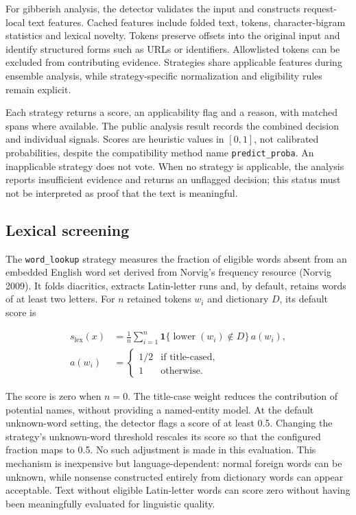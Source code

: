 \documentclass[10pt,a4paper,twocolumn]{article}
\begin{document}
For gibberish analysis, the detector validates the input and constructs
request-local text features. Cached features include folded text,
tokens, character-bigram statistics and lexical novelty. Tokens preserve
offsets into the original input and identify structured forms such as
URLs or identifiers. Allowlisted tokens can be excluded from
contributing evidence. Strategies share applicable features during
ensemble analysis, while strategy-specific normalization and eligibility
rules remain explicit.

Each strategy returns a score, an applicability flag and a reason, with
matched spans where available. The public analysis result records the
combined decision and individual signals. Scores are heuristic values in
\([0,1]\), not calibrated probabilities, despite the compatibility
method name \texttt{predict\_proba}. An inapplicable strategy does not
vote. When no strategy is applicable, the analysis reports insufficient
evidence and returns an unflagged decision; this status must not be
interpreted as proof that the text is meaningful.

\subsection{Lexical screening}\label{lexical-screening}

The \texttt{word\_lookup} strategy measures the fraction of eligible
words absent from an embedded English word set derived from Norvig's
frequency resource (Norvig 2009). It folds diacritics, extracts
Latin-letter runs and, by default, retains words of at least two
letters. For \(n\) retained tokens \(w_i\) and dictionary \(D\), its
default score is

\begin{equation}
\begin{aligned}
s_{\mathrm{lex}}(x)&=\frac{1}{n}\sum_{i=1}^{n}
\mathbf{1}\{\operatorname{lower}(w_i)\notin D\}\,a(w_i),\\
a(w_i)&=\begin{cases}1/2 & \text{if title-cased},\\1 & \text{otherwise}.\end{cases}
\end{aligned}
\end{equation}

The score is zero when \(n=0\). The title-case weight reduces the
contribution of potential names, without providing a named-entity model.
At the default unknown-word setting, the detector flags a score of at
least 0.5. Changing the strategy's unknown-word threshold rescales its
score so that the configured fraction maps to 0.5. No such adjustment is
made in this evaluation. This mechanism is inexpensive but
language-dependent: normal foreign words can be unknown, while nonsense
constructed entirely from dictionary words can appear acceptable. Text
without eligible Latin-letter words can score zero without having been
meaningfully evaluated for linguistic quality.
\end{document}
